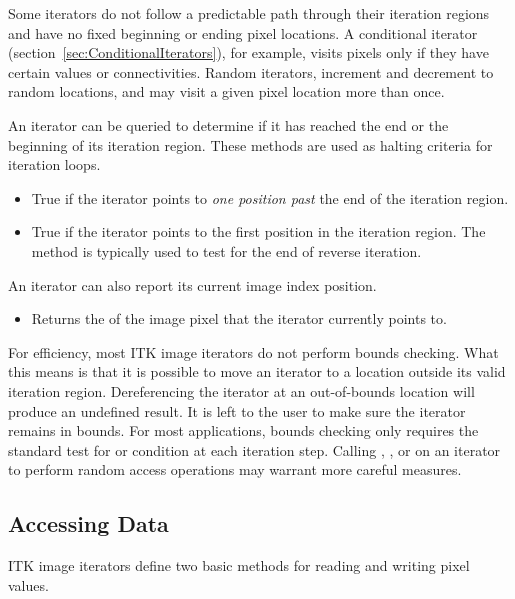 Some iterators do not follow a predictable path through their iteration regions
and have no fixed beginning or ending pixel locations.  A conditional iterator
(section~\ref{sec:ConditionalIterators}), for example, visits pixels only if
they have certain values or connectivities.  Random iterators, increment and
decrement to random locations, and may visit a given pixel location more than
once.

An iterator can be queried to determine if it has reached the end or the
beginning of its iteration region.  These methods are used as halting criteria
for iteration loops.

\begin{itemize}
\item \textbf{} True if the iterator points to \emph{one
position past} the end of the iteration region.

\item \textbf{} True if the iterator points to the first
position in the iteration region.  The method is typically used to test for the
end of reverse iteration.

\end{itemize}

An iterator can also report its current image index position.

\begin{itemize}
\item \textbf{} Returns the 
of the image pixel that the iterator currently points to.
\end{itemize}

For efficiency, most ITK image iterators do not perform bounds checking.  What
this means is that it is possible to move an iterator to a location outside its
valid iteration region.  Dereferencing the iterator at an out-of-bounds location
will produce an undefined result. It is left to the user to make sure the
iterator remains in bounds.  For most applications,  bounds checking only
requires the standard test for  or  condition at each
iteration step.  Calling ,  , or
 on an iterator to perform random access operations may
warrant more careful measures. 

\subsection{Accessing Data}
\label{sec:AccessingData}
ITK image iterators define two basic methods for reading and writing pixel
values.

